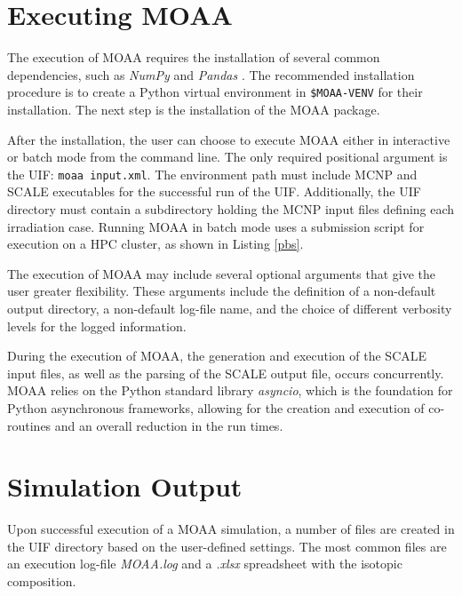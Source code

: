 \section{Executing MOAA}

The execution of MOAA requires the installation of several common dependencies, such as \textit{NumPy} \cite{numpy} and \textit{Pandas} \cite{pandas}.
The recommended installation procedure is to create a Python virtual environment in \texttt{\$MOAA-VENV} for their installation.
The next step is the installation of the MOAA package.

After the installation, the user can choose to execute MOAA either in interactive or batch mode from the command line.
The only required positional argument is the UIF: \texttt{moaa input.xml}.
The environment path must include MCNP and SCALE executables for the successful run of the UIF.
Additionally, the UIF directory must contain a subdirectory holding the MCNP input files defining each irradiation case.
Running MOAA in batch mode uses a submission script for execution on a \gls*{HPC} cluster, as shown in Listing \ref{pbs}.



The execution of MOAA may include several optional arguments that give the user greater flexibility.
These arguments include the definition of a non-default output directory, a non-default log-file name, and the choice of different verbosity levels for the logged information.

During the execution of MOAA, the generation and execution of the SCALE input files, as well as the parsing of the SCALE output file, occurs concurrently.
MOAA relies on the Python standard library \textit{asyncio}, which is the foundation for Python asynchronous frameworks, allowing for the creation and execution of co-routines and an overall reduction in the run times.


\section{Simulation Output}
\label{sec:out}

Upon successful execution of a MOAA simulation, a number of files are created in the UIF directory based on the user-defined settings.
The most common files are an execution log-file \textit{MOAA.log} and a \textit{.xlsx} spreadsheet with the isotopic composition.

